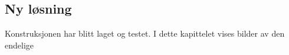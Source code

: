 \subsection{Ny løsning}
Konstruksjonen har blitt laget og testet. I dette kapittelet vises bilder av den endelige 